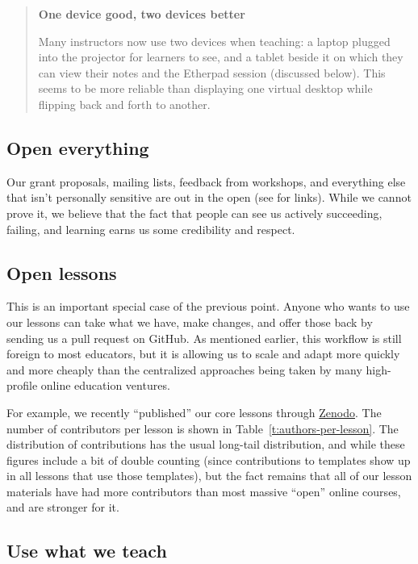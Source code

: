 \documentclass[10pt,a4paper,twocolumn]{article}
\begin{document}
\begin{quote}
\textbf{One device good, two devices better}

Many instructors now use two devices when teaching: a laptop plugged
into the projector for learners to see, and a tablet beside it on
which they can view their notes and the Etherpad session (discussed
below).  This seems to be more reliable than displaying one virtual
desktop while flipping back and forth to another.
\end{quote}

\subsection*{Open everything}

Our grant proposals, mailing lists, feedback from workshops, and
everything else that isn't personally sensitive are out in the open
(see \cite{swcsite} for links).  While we cannot prove it, we believe
that the fact that people can see us actively succeeding, failing, and
learning earns us some credibility and respect.

\subsection*{Open lessons}

This is an important special case of the previous point. Anyone who
wants to use our lessons can take what we have, make changes, and offer
those back by sending us a pull request on GitHub. As mentioned earlier,
this workflow is still foreign to most educators, but it is allowing us
to scale and adapt more quickly and more cheaply than the centralized
approaches being taken by many high-profile online education ventures.

For example, we recently ``published'' our core lessons through
\href{https://zenodo.org/}{Zenodo}.  The number of contributors per
lesson is shown in Table~\ref{t:authors-per-lesson}.  The distribution
of contributions has the usual long-tail distribution, and while these
figures include a bit of double counting (since contributions to
templates show up in all lessons that use those templates), but the
fact remains that all of our lesson materials have had more
contributors than most massive ``open'' online courses, and are
stronger for it.

\subsection*{Use what we teach}
\end{document}
